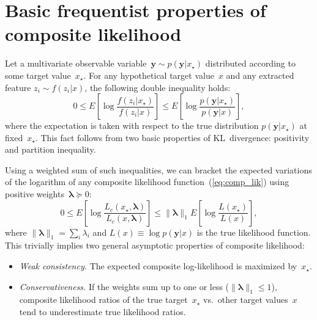 \documentclass[english]{scrartcl}
\def\y{{\mathbf{y}}}
\newcommand{\blambda}{{\boldsymbol{\lambda}}}
\begin{document}



\appendix


\section{Basic frequentist properties of composite likelihood}
\label{app:frequentist}

Let a multivariate observable variable~$\y \sim p(\y|x_\star)$ distributed according to some target value~$x_\star$. For any hypothetical target value~$x$ and any extracted feature $z_i\sim f(z_i|x)$, the following double inequality holds:
$$
0 \leq
E\left[
\log \frac{f(z_i|x_\star)}{f(z_i|x)}
\right]
\leq
E\left[
\log \frac{p(\y|x_\star)}{p(\y|x)}
\right],
$$
where the expectation is taken with respect to the true distribution $p(\y|x_\star)$ at fixed~$x_\star$. This fact follows from two basic properties of KL~divergence: positivity and partition inequality.

Using a weighted sum of such inequalities, we can bracket the expected variations of the logarithm of any composite likelihood function~(\ref{eq:comp_lik}) using positive weights~$\blambda\succeq 0$:
\begin{equation}
\label{eq:variation_bound}
0 \leq
E\left[ \log \frac{L_c(x_\star, \blambda)}{L_c(x,\blambda)} \right]
\leq 
\|\blambda\|_1 E\left[ \log \frac{L(x_\star)}{L(x)} \right]
,
\end{equation}
where $\|\blambda\|_1 =\sum_i \lambda_i$ and $L(x)\equiv \log p(\y|x)$ is the true likelihood function. This trivially implies two general asymptotic properties of composite likelihood:
\begin{itemize}
\item {\em Weak consistency.} The expected composite log-likelihood is maximized by~$x_\star$.
\item {\em Conservativeness.} If the weights sum up to one or less ($\|\blambda\|_1\leq 1$), composite likelihood ratios of the true target~$x_\star$ vs.~other target values~$x$ tend to  underestimate true likelihood ratios.
\end{itemize}
\end{document}
